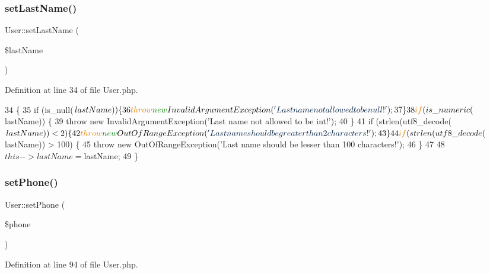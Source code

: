 \subsubsection{\texorpdfstring{set\+Last\+Name()}{setLastName()}}
{\footnotesize\ttfamily User\+::set\+Last\+Name (\begin{DoxyParamCaption}\item[{}]{\$last\+Name }\end{DoxyParamCaption})}



Definition at line 34 of file User.\+php.


\begin{DoxyCode}
34                                           \{
35         \textcolor{keywordflow}{if} (is\_null($lastName)) \{
36             \textcolor{keywordflow}{throw} \textcolor{keyword}{new} InvalidArgumentException(\textcolor{stringliteral}{'Last name not allowed to be null!'});
37         \}
38         \textcolor{keywordflow}{if} (is\_numeric($lastName)) \{
39             \textcolor{keywordflow}{throw} \textcolor{keyword}{new} InvalidArgumentException(\textcolor{stringliteral}{'Last name not allowed to be int!'});
40         \}
41         \textcolor{keywordflow}{if} (strlen(utf8\_decode($lastName)) < 2) \{
42             \textcolor{keywordflow}{throw} \textcolor{keyword}{new} OutOfRangeException(\textcolor{stringliteral}{'Last name should be greater than 2 characters!'});
43         \}
44         \textcolor{keywordflow}{if} (strlen(utf8\_decode($lastName)) > 100) \{
45             \textcolor{keywordflow}{throw} \textcolor{keyword}{new} OutOfRangeException(\textcolor{stringliteral}{'Last name should be lesser than 100 characters!'});
46         \}
47 
48         $this->lastName = $lastName;
49     \}
\end{DoxyCode}
\hypertarget{class_user_a81a82307eef393fb41f0b3b76375472c}{}\label{class_user_a81a82307eef393fb41f0b3b76375472c} 
\subsubsection{\texorpdfstring{set\+Phone()}{setPhone()}}
{\footnotesize\ttfamily User\+::set\+Phone (\begin{DoxyParamCaption}\item[{}]{\$phone }\end{DoxyParamCaption})}



Definition at line 94 of file User.\+php.


